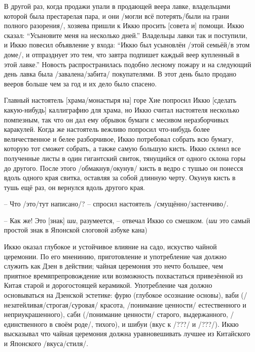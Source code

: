 \begin{ver}
В другой раз, когда продажи упали в продающей веера лавке, владельцами
которой была престарелая пара, и они /могли всё потерять/были на грани
полного разорения/, хозяева пришли к Иккю просить [совета и] помощи. Иккю
сказал: ``Усыновите меня на несколько дней.'' Владельцы лавки так и
поступили, и Иккю повесил объявление у входа: ``Иккю был усыновлён
/этой семьёй/в этом доме/, и отпразднует это тем, что завтра подпишет
каждый веер купленный в этой лавке.'' Новость распространилась подобно
лесному пожару и на следующий день лавка была /завалена/забита/
покупателями. В этот день было продано вееров больше чем за год и их
дело было спасено. 

Главный настоятель [храма/монастыря на] горе Хие попросил Иккю
[сделать какую-нибудь] каллиграфию для храма, но Иккю считал
настоятеля несколько помпезным, так что он дал ему обрывок бумаги с
месивом неразборчивых каракулей. Когда же настоятель вежливо попросил
что-нибудь более величественное и белее разборчивое, Иккю потребовал
собрать всю бумагу, которую тот сможет собрать, а также самую большую
кисть. Иккю склеил все полученные листы в один гигантский свиток,
тянущийся от одного склона горы до другого. После этого /обмакнув/окунув/ кисть
в ведро с тушью он понесся вдоль одного края свитка, оставляя за собой
длинную черту. Окунув кисть в тушь ещё раз, он вернулся вдоль другого
края.

-- Что /это/тут написано/? -- спросил настоятель
/смущённо/застенчиво/.

-- Как же! Это [знак] {\em ши}, разумеется, -- отвечал Иккю со
смешком. ({\em ши} это самый простой знак в Японской слоговой азбуке
кана)
\end{ver}

\begin{ver}
  Иккю оказал глубокое и устойчивое влияние на садо, искуство чайной
  церемонии. По его мненинию, приготовление и употребление чая должно
  служить как Дзен в действии; чайная церемония это нечто большее, чем
  приятное времяпрепровождение или возможность похвастаться
  привезённой из Китая старой и дорогостоящей керамикой. Употребление
  чая должно основываться на Дзенской эстетике: фурю (глубокое
  осознание основы), ваби (/незатейливая/строгая/суровая/ красота,
  /понимание ценности/ естественного и
  неприукрашенного), саби (/понимание ценности/
  старого, выдержанного, /единственного в своём роде/,
  тихого), и шибуи (вкус к /???/ и /???/). Иккю высказывал что чайная церемония должна
  уравновешивать лучшее из Китайского и Японского
  /вкуса/стиля/. 
\end{ver}

